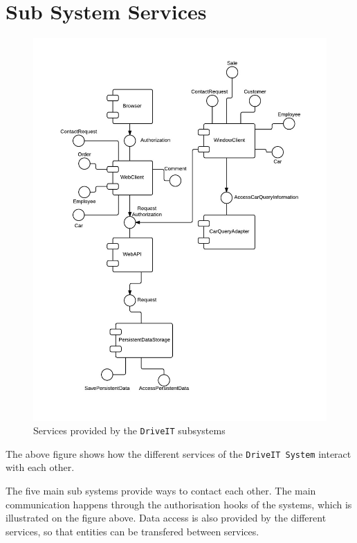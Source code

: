\chapter{Sub System Services}
\begin{figure}[H]
	\centering
	\includegraphics[width=\textwidth]{Figures/SubsystemServices}
	\caption{Services provided by the \texttt{DriveIT} subsystems}
	\label{fig:subsystemservices}
\end{figure}

The above figure shows how the different services of the \texttt{DriveIT System} interact with each other.

The five main sub systems provide ways to contact each other. The main communication happens through the authorisation hooks of the systems, which is illustrated on the figure above.
Data access is also provided by the different services, so that entities can be transfered between services.